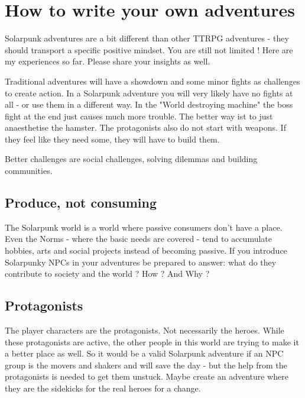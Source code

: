 

\section {How to write your own adventures}

Solarpunk adventures are a bit different than other TTRPG adventures - they should transport a specific positive mindset. You are still not limited ! Here are my experiences so far. Please share your insights as well.

Traditional adventures will have a showdown and some minor fights as challenges to create action. In a Solarpunk adventure you will very likely have no fights at all - or use them in a different way. In the "World destroying machine" the boss fight at the end just causes much more trouble. The better way ist to just anaesthetise the hamster. The protagonists also do not start with weapons. If they feel like they need some, they will have to build them.

Better challenges are social challenges, solving dilemmas and building communities.

\subsection{Produce, not consuming}

The Solarpunk world is a world where passive consumers don't have a place. Even the Norms - where the basic needs are covered - tend to accumulate hobbies, arts and social projects instead of becoming passive. If you introduce Solarpunky NPCs in your adventures be prepared to answer: what do they contribute to society and the world ? How ? And Why ?

\subsection{Protagonists}

The player characters are the protagonists. Not necessarily the heroes. While these protagonists are active, the other people in this world are trying to make it a better place as well. So it would be a valid Solarpunk adventure if an NPC group is the movers and shakers and will save the day - but the help from the protagonists is needed to get them unstuck. Maybe create an adventure where they are the sidekicks for the real heroes for a change.

